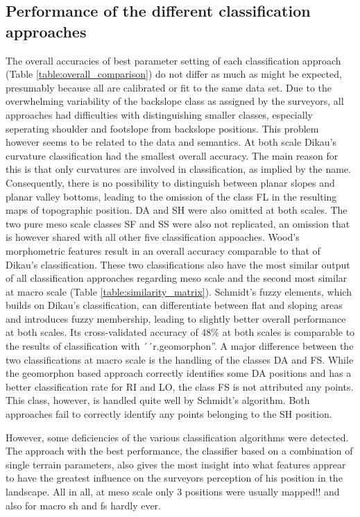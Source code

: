 \documentclass[preprint,12pt,authoryear]{elsarticle}
\begin{document}
\subsection{Performance of the different classification approaches}  
The overall accuracies of best parameter setting of each classification approach (Table \ref{table:overall_comparison}) do not differ as much as might be expected, presumably because all are calibrated or fit to the same data set. Due to the overwhelming variability of the backslope class as assigned by the surveyors, all approaches had difficulties with distinguishing smaller classes, especially seperating shoulder and footslope from backslope positions. This problem however seems to be related to the data and semantics. 
At both scale Dikau's curvature classification had the smallest overall accuracy. The main reason for this is that only curvatures are involved in classification, as implied by the name. Consequently, there is no possibility to distinguish between planar slopes and planar valley bottoms, leading to the omission of the class FL in the resulting maps of topographic position. DA and SH were also omitted at both scales. The two pure meso scale classes SF and SS were also not replicated, an omission that is however shared with all other five classification appoaches. Wood's morphometric features result in an overall accuracy comparable to that of Dikau's classification. These two classifications also have the most similar output of all classification approaches regarding meso scale and the second most similar at macro scale (Table \ref{table:similarity_matrix}). Schmidt's fuzzy elements, which builds on Dikau's classification, can differentiate between flat and sloping areas and introduces fuzzy membership, leading to slightly better overall performance at both scales. Its cross-validated accuracy of 48\% at both scales is comparable to the results of classification with ´´r.geomorphon''.  A major difference between the two classifications at macro scale is the handling of the classes DA and FS. While the geomorphon based approach correctly identifies some DA positions and has a better classification rate for RI and LO, the class FS is not attributed any points. This class, however, is handled quite well by Schmidt's algorithm. Both approaches fail to correctly identify any points belonging to the SH position. 

However, some deficiencies of the various classification algorithms were detected.
The approach with the best performance, the classifier based on a combination of single terrain parameters, also gives the most insight into what features apprear to have the greatest influence on the surveyors perception of his position in the landscape. 
All in all, at meso scale only 3 positions were usually mapped!! and also for macro sh and fs hardly ever.
\end{document}
